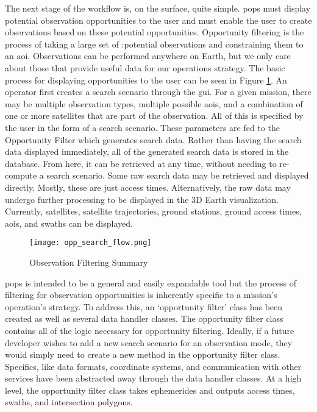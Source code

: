 The next stage of the workflow is, on the surface, quite simple. \gls{pops}
must display potential observation opportunities to the user and must enable
the user to create observations based on these potential opportunities.
Opportunity filtering is the process of taking a large set of :potential
observations and constraining them to an \gls{aoi}. Observations can be
performed anywhere on Earth, but we only care about those that provide useful
data for our operations strategy.  The basic process for displaying
opportunities to the user can be seen in Figure \ref{fig:obs_fil}. An operator
first creates a search scenario through the \gls{gui}.  For a given mission,
there may be multiple observation types, multiple possible \glspl{aoi}, and a
combination of one or more satellites that are part of the observation. All of
this is specified by the user in the form of a search scenario. These
parameters are fed to the Opportunity Filter which generates search data.
Rather than having the search data displayed immediately, all of the generated
search data is stored in the database. From here, it can be retrieved at any
time, without needing to re-compute a search scenario. Some raw search data may
be retrieved and displayed directly. Mostly, these are just access times.
Alternatively, the raw data may undergo further processing to be displayed in
the 3D Earth visualization. Currently, satellites, satellite trajectories,
ground stations, ground access times, \glspl{aoi}, and swaths can be displayed.


\begin{figure} 
    \centering
    \texttt{[image: opp\_search\_flow.png]} 
    \caption{Observation Filtering Summary}
    \label{fig:obs_fil} 
\end{figure}


\gls{pops} is intended to be a general and easily expandable tool but the process of
filtering for observation opportunities is inherently specific to a mission’s
operation’s strategy. To address this, an ‘opportunity filter’ class has been
created as well as several data handler classes. The opportunity filter class
contains all of the logic necessary for opportunity filtering. Ideally, if a
future developer wishes to add a new search scenario for an observation mode,
they would simply need to create a new method in the opportunity filter class.
Specifics, like data formats, coordinate systems, and communication with other
services have been abstracted away through the data handler classes. At a high
level, the opportunity filter class takes ephemerides and outputs access times,
swaths, and intersection polygons.

